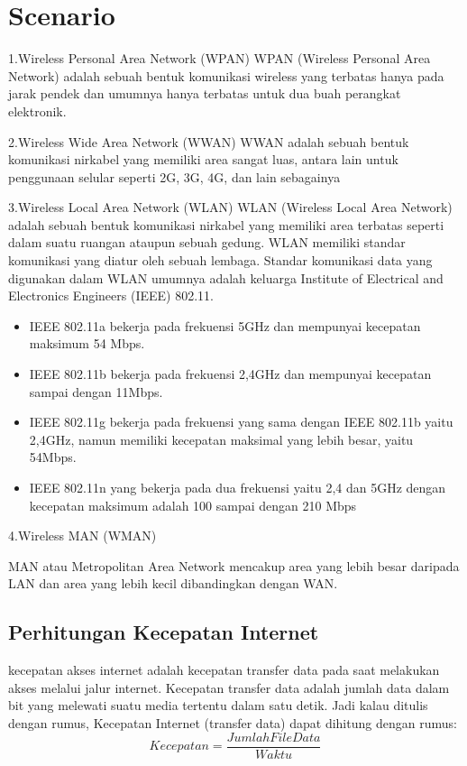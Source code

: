 \documentclass[conference]{IEEEtran}
\begin{document}
\section{Scenario}
1.Wireless Personal Area Network (WPAN)
WPAN (Wireless Personal Area Network) adalah sebuah bentuk komunikasi wireless yang terbatas hanya pada jarak pendek dan umumnya hanya terbatas untuk dua buah perangkat elektronik.
\vspace{5pt}

2.Wireless Wide Area Network (WWAN)
WWAN adalah sebuah bentuk komunikasi nirkabel yang memiliki area sangat luas, antara lain untuk penggunaan selular seperti 2G, 3G, 4G, dan lain sebagainya
\vspace{5pt}

3.Wireless Local Area Network (WLAN)
WLAN (Wireless Local Area Network) adalah sebuah bentuk komunikasi nirkabel yang memiliki area terbatas seperti dalam suatu ruangan ataupun sebuah gedung. WLAN memiliki standar komunikasi yang diatur oleh sebuah lembaga. Standar komunikasi data yang digunakan dalam WLAN umumnya adalah keluarga Institute of Electrical and Electronics Engineers (IEEE) 802.11.
\begin{itemize}
    \item  IEEE 802.11a bekerja pada frekuensi 5GHz dan mempunyai kecepatan maksimum 54 Mbps.
    \item IEEE 802.11b bekerja pada frekuensi 2,4GHz dan mempunyai kecepatan sampai dengan 11Mbps.
    \item IEEE 802.11g bekerja pada frekuensi yang sama dengan IEEE 802.11b yaitu 2,4GHz, namun memiliki kecepatan maksimal yang lebih besar, yaitu 54Mbps.
    \item   IEEE 802.11n yang bekerja pada dua frekuensi yaitu 2,4 dan 5GHz dengan kecepatan maksimum adalah 100 sampai dengan 210 Mbps
\end{itemize}
\vspace{5pt}

4.Wireless MAN (WMAN)
\vspace{1pt}

MAN atau Metropolitan Area Network mencakup area yang lebih besar daripada LAN dan area yang lebih kecil dibandingkan dengan WAN.
\subsection{Perhitungan Kecepatan Internet}
kecepatan akses internet adalah kecepatan transfer data pada saat melakukan akses melalui jalur internet. Kecepatan transfer data adalah jumlah data dalam bit yang melewati suatu media tertentu dalam satu detik.
Jadi kalau ditulis dengan rumus, Kecepatan Internet (transfer data) dapat dihitung dengan rumus:
\begin{equation}
    Kecepatan = \frac{Jumlah File Data}{Waktu}
    \label{rerata_rssi}
\end{equation}
\end{document}
